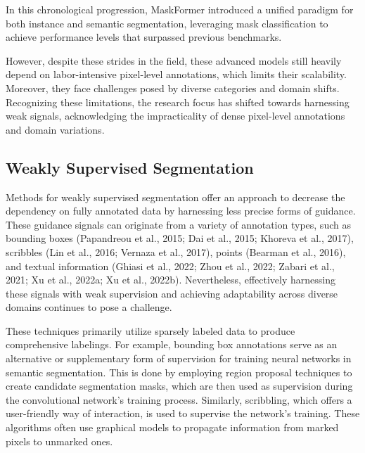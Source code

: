 In this chronological progression, MaskFormer \cite{cheng2021per} introduced a unified paradigm for both instance and semantic segmentation, leveraging mask classification to achieve performance levels that surpassed previous benchmarks.

However, despite these strides in the field, these advanced models still heavily depend on labor-intensive pixel-level annotations, which limits their scalability. Moreover, they face challenges posed by diverse categories and domain shifts. Recognizing these limitations, the research focus has shifted towards harnessing weak signals, acknowledging the impracticality of dense pixel-level annotations and domain variations.
\subsection{Weakly Supervised Segmentation}
Methods for weakly supervised segmentation offer an approach to decrease the dependency on fully annotated data by harnessing less precise forms of guidance. These guidance signals can originate from a variety of annotation types, such as bounding boxes (Papandreou et al., 2015; Dai et al., 2015; Khoreva et al., 2017), scribbles (Lin et al., 2016; Vernaza et al., 2017), points (Bearman et al., 2016), and textual information (Ghiasi et al., 2022; Zhou et al., 2022; Zabari et al., 2021; Xu et al., 2022a; Xu et al., 2022b). Nevertheless, effectively harnessing these signals with weak supervision and achieving adaptability across diverse domains continues to pose a challenge.

These techniques primarily utilize sparsely labeled data to produce comprehensive labelings. For example, bounding box annotations serve as an alternative or supplementary form of supervision for training neural networks in semantic segmentation. This is done by employing region proposal techniques \cite{uijlings2013selective} to create candidate segmentation masks, which are then used as supervision during the convolutional network's training process. Similarly, scribbling, which offers a user-friendly way of interaction, is used to supervise the network's training. These algorithms often use graphical models to propagate information from marked pixels to unmarked ones.

